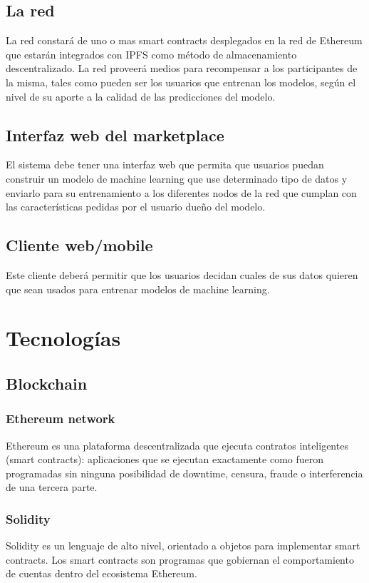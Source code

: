 \documentclass[
11pt, %
oneside, %
spanish, %
singlespacing, %
headsepline, %
chapterinoneline, %
]{MastersDoctoralThesis} %
\begin{document}
\section{La red}
La red constará de uno o mas smart contracts desplegados en la red de Ethereum que estarán integrados con IPFS como método de almacenamiento descentralizado.
La red proveerá medios para recompensar a los participantes de la misma, tales como pueden ser los usuarios que entrenan los modelos, según el nivel de su aporte a la calidad de las predicciones del modelo.

\section{Interfaz web del marketplace}
El sistema debe tener una interfaz web que permita que usuarios puedan construir un modelo de machine learning que use determinado tipo de datos y enviarlo para su entrenamiento a los diferentes nodos de la red que cumplan con las características pedidas por el usuario dueño del modelo.

\section{Cliente web/mobile}
Este cliente deberá permitir que los usuarios decidan cuales de sus datos quieren que sean usados para entrenar modelos de machine learning.

\chapter{Tecnolog\'ias}

\section{Blockchain}

\subsection{Ethereum network \cite{eth}}
Ethereum es una plataforma descentralizada que ejecuta contratos inteligentes (smart contracts): aplicaciones que se ejecutan exactamente como fueron programadas sin ninguna posibilidad de downtime, censura, fraude o interferencia de una tercera parte.

\subsection{Solidity \cite{sol}}
Solidity es un lenguaje de alto nivel, orientado a objetos para implementar smart contracts. Los smart contracts son programas que gobiernan el comportamiento de cuentas dentro del ecosistema Ethereum.
\end{document}
